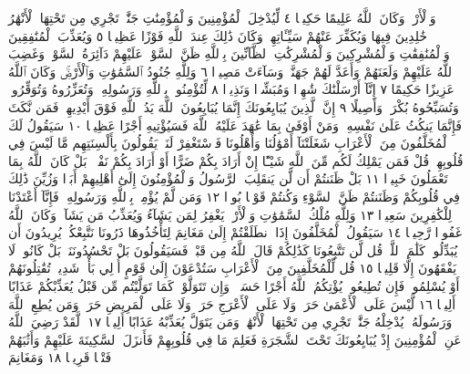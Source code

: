 وَٱلْأَرْضِۚ وَكَانَ ٱللَّهُ عَلِيمًا حَكِيمࣰا ٤ لِّيُدْخِلَ ٱلْمُؤْمِنِينَ وَٱلْمُؤْمِنَٰتِ
جَنَّٰتࣲ تَجْرِي مِن تَحْتِهَا ٱلْأَنْهَٰرُ خَٰلِدِينَ فِيهَا وَيُكَفِّرَ عَنْهُمْ
سَيِّـَٔاتِهِمْۚ وَكَانَ ذَٰلِكَ عِندَ ٱللَّهِ فَوْزًا عَظِيمࣰا ٥ وَيُعَذِّبَ
ٱلْمُنَٰفِقِينَ وَٱلْمُنَٰفِقَٰتِ وَٱلْمُشْرِكِينَ وَٱلْمُشْرِكَٰتِ ٱلظَّآنِّينَ
بِٱللَّهِ ظَنَّ ٱلسَّوْءِۚ عَلَيْهِمْ دَآئِرَةُ ٱلسَّوْءِۖ وَغَضِبَ ٱللَّهُ عَلَيْهِمْ
وَلَعَنَهُمْ وَأَعَدَّ لَهُمْ جَهَنَّمَۖ وَسَآءَتْ مَصِيرࣰا ٦ وَلِلَّهِ جُنُودُ
ٱلسَّمَٰوَٰتِ وَٱلْأَرْضِۚ وَكَانَ ٱللَّهُ عَزِيزًا حَكِيمًا ٧ إِنَّآ
أَرْسَلْنَٰكَ شَٰهِدࣰا وَمُبَشِّرࣰا وَنَذِيرࣰا ٨ لِّتُؤْمِنُوا۟ بِٱللَّهِ وَرَسُولِهِۦ
وَتُعَزِّرُوهُ وَتُوَقِّرُوهُۚ وَتُسَبِّحُوهُ بُكْرَةࣰ وَأَصِيلًا ٩
إِنَّ ٱلَّذِينَ يُبَايِعُونَكَ إِنَّمَا يُبَايِعُونَ ٱللَّهَ يَدُ ٱللَّهِ فَوْقَ
أَيْدِيهِمْۚ فَمَن نَّكَثَ فَإِنَّمَا يَنكُثُ عَلَىٰ نَفْسِهِۦۖ وَمَنْ أَوْفَىٰ
بِمَا عَٰهَدَ عَلَيْهُ ٱللَّهَ فَسَيُؤْتِيهِ أَجْرًا عَظِيمࣰا ١٠ سَيَقُولُ
لَكَ ٱلْمُخَلَّفُونَ مِنَ ٱلْأَعْرَابِ شَغَلَتْنَآ أَمْوَٰلُنَا وَأَهْلُونَا
فَٱسْتَغْفِرْ لَنَاۚ يَقُولُونَ بِأَلْسِنَتِهِم مَّا لَيْسَ فِي قُلُوبِهِمْۚ قُلْ
فَمَن يَمْلِكُ لَكُم مِّنَ ٱللَّهِ شَيْـًٔا إِنْ أَرَادَ بِكُمْ ضَرًّا أَوْ أَرَادَ بِكُمْ
نَفْعَۢاۚ بَلْ كَانَ ٱللَّهُ بِمَا تَعْمَلُونَ خَبِيرَۢا ١١ بَلْ ظَنَنتُمْ أَن لَّن
يَنقَلِبَ ٱلرَّسُولُ وَٱلْمُؤْمِنُونَ إِلَىٰٓ أَهْلِيهِمْ أَبَدࣰا وَزُيِّنَ ذَٰلِكَ فِي
قُلُوبِكُمْ وَظَنَنتُمْ ظَنَّ ٱلسَّوْءِ وَكُنتُمْ قَوْمَۢا بُورࣰا ١٢ وَمَن لَّمْ يُؤْمِنۢ
بِٱللَّهِ وَرَسُولِهِۦ فَإِنَّآ أَعْتَدْنَا لِلْكَٰفِرِينَ سَعِيرࣰا ١٣ وَلِلَّهِ مُلْكُ
ٱلسَّمَٰوَٰتِ وَٱلْأَرْضِۚ يَغْفِرُ لِمَن يَشَآءُ وَيُعَذِّبُ مَن يَشَآءُۚ
وَكَانَ ٱللَّهُ غَفُورࣰا رَّحِيمࣰا ١٤ سَيَقُولُ ٱلْمُخَلَّفُونَ إِذَا
ٱنطَلَقْتُمْ إِلَىٰ مَغَانِمَ لِتَأْخُذُوهَا ذَرُونَا نَتَّبِعْكُمْۖ يُرِيدُونَ
أَن يُبَدِّلُوا۟ كَلَٰمَ ٱللَّهِۚ قُل لَّن تَتَّبِعُونَا كَذَٰلِكُمْ قَالَ ٱللَّهُ مِن قَبْلُۖ
فَسَيَقُولُونَ بَلْ تَحْسُدُونَنَاۚ بَلْ كَانُوا۟ لَا يَفْقَهُونَ إِلَّا قَلِيلࣰا ١٥
قُل لِّلْمُخَلَّفِينَ مِنَ ٱلْأَعْرَابِ سَتُدْعَوْنَ إِلَىٰ قَوْمٍ أُو۟لِي بَأْسࣲ شَدِيدࣲ
تُقَٰتِلُونَهُمْ أَوْ يُسْلِمُونَۖ فَإِن تُطِيعُوا۟ يُؤْتِكُمُ ٱللَّهُ أَجْرًا حَسَنࣰاۖ
وَإِن تَتَوَلَّوْا۟ كَمَا تَوَلَّيْتُم مِّن قَبْلُ يُعَذِّبْكُمْ عَذَابًا أَلِيمࣰا ١٦ لَّيْسَ
عَلَى ٱلْأَعْمَىٰ حَرَجࣱ وَلَا عَلَى ٱلْأَعْرَجِ حَرَجࣱ وَلَا عَلَى ٱلْمَرِيضِ حَرَجࣱۗ
وَمَن يُطِعِ ٱللَّهَ وَرَسُولَهُۥ يُدْخِلْهُ جَنَّٰتࣲ تَجْرِي مِن تَحْتِهَا
ٱلْأَنْهَٰرُۖ وَمَن يَتَوَلَّ يُعَذِّبْهُ عَذَابًا أَلِيمࣰا ١٧۞ لَّقَدْ رَضِيَ ٱللَّهُ
عَنِ ٱلْمُؤْمِنِينَ إِذْ يُبَايِعُونَكَ تَحْتَ ٱلشَّجَرَةِ فَعَلِمَ مَا فِي
قُلُوبِهِمْ فَأَنزَلَ ٱلسَّكِينَةَ عَلَيْهِمْ وَأَثَٰبَهُمْ فَتْحࣰا قَرِيبࣰا ١٨ وَمَغَانِمَ
